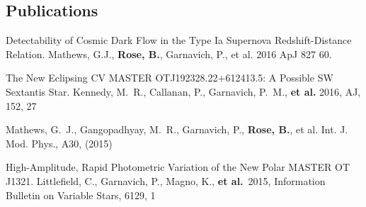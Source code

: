 \documentclass[margin]{res}
\begin{document}
\begin{resume}





\section{Publications}
Detectability of Cosmic Dark Flow in the Type Ia Supernova Redshift-Distance Relation. Mathews, G.J., {\bf Rose, B.}, Garnavich, P., et al. 2016 ApJ 827 60.

The New Eclipsing CV MASTER OTJ192328.22+612413.5: A Possible SW Sextantis Star. Kennedy, M.~R., Callanan, P., Garnavich, P.~M., {\bf et al.} 2016, AJ, 152, 27

Mathews, G.~J., Gangopadhyay, M.~R., Garnavich, P., {\bf Rose, B.}, et al. Int. J. Mod. Phys., A30, (2015)

High-Amplitude, Rapid Photometric Variation of the New Polar MASTER OT J1321. Littlefield, C., Garnavich, P., Magno, K., {\bf et al.}\ 2015, Information Bulletin on Variable Stars, 6129, 1


\newpage
\addtocounter{section}{1}
{}




\nocite{*}






\end{resume}
\end{document}

